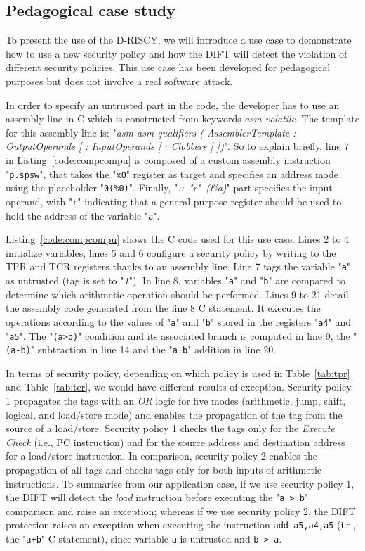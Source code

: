 \subsection{Pedagogical case study}
\label{section:pedagogical_usecase}
To present the use of the D-RISCY, we will introduce a use case to demonstrate how to use a new security policy and how the DIFT will detect the violation of different security policies.
This use case has been developed for pedagogical purposes but does not involve a real software attack.

In order to specify an untrusted part in the code, the developer has to use an assembly line in C which is constructed from keywords \textit{asm volatile}. The template for this assembly line is: "\textit{asm asm-qualifiers ( AssemblerTemplate : OutputOperands [ : InputOperands [ : Clobbers ] ])}".
So to explain briefly, line 7 in Listing~\ref{code:compcompu} is composed of a custom assembly instruction "\texttt{p.spsw}", that takes the "\texttt{x0}" register as target and specifies an address mode using the placeholder "\texttt{0(\%0)}". Finally, \mbox{"\textit{:: "r" (\&a)}"} part specifies the input operand, with "\texttt{r}" indicating that a general-purpose register should be used to hold the address of the variable "\texttt{a}".

Listing~\ref{code:compcompu} shows the C code used for this use case. Lines 2 to 4 initialize variables, lines 5 and 6 configure a security policy by writing to the TPR and TCR registers thanks to an assembly line. Line 7 tags the variable "\verb|a|" as untrusted (tag is set to "\textit{1}"). In line 8, variables "\verb|a|" and "\verb|b|" are compared to determine which arithmetic operation should be performed.
Lines 9 to 21 detail the assembly code generated from the line 8 C statement. It executes the operations according to the values of "\verb|a|" and "\verb|b|" stored in the registers "\verb|a4|" and "\verb|a5|". The "\verb|(a>b)|" condition and its associated branch is computed in line 9, the "\verb|(a-b)|" subtraction in line 14 and the "\verb|a+b|" addition in line 20.

In terms of security policy, depending on which policy is used in Table~\ref{tab:tpr} and Table~\ref{tab:tcr}, we would have different results of exception.
Security policy 1 propagates the tags with an \textit{OR} logic for five modes (arithmetic, jump, shift, logical, and load/store mode) and enables the propagation of the tag from the source of a load/store.
Security policy 1 checks the tags only for the \textit{Execute Check} (i.e., PC instruction) and for the source address and destination address for a load/store instruction.
In comparison, security policy 2 enables the propagation of all tags and checks tags only for both inputs of arithmetic instructions.
To summarise from our application case, if we use security policy 1, the DIFT will detect the \textit{load} instruction before executing the "\verb|a > b|" comparison and raise an exception; whereas if we use security policy 2, the DIFT protection raises an exception when executing the instruction \verb|add a5,a4,a5| (i.e., the "\verb|a+b|" C statement), since variable \verb|a| is untrusted and \verb|b > a|.

